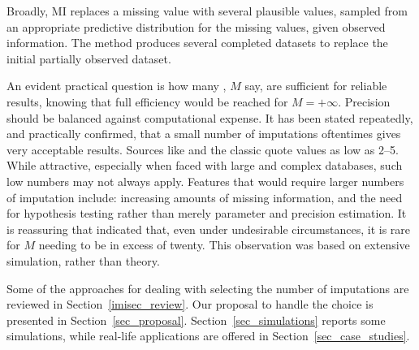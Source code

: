 \documentclass[11pt,a5paper,twoside]{book}
\begin{document}
Broadly, MI replaces a missing value with several plausible values, sampled from an appropriate predictive distribution for the missing values, given observed information. The method produces several completed datasets to replace the initial partially observed dataset.

An evident practical question is how many {\color{black}{imputed datasets}}, $M$ say, are sufficient for reliable results, knowing that full efficiency would be reached for $M=+\infty$. Precision should be balanced against computational expense. It has been stated repeatedly, and practically confirmed, that a small number of imputations oftentimes gives very acceptable results. Sources like \cite{rubin1987} and the classic \cite{littlerubin2002} quote values as low as 2--5. While attractive, especially when faced with large and complex databases, such low numbers may not always apply. Features that would require larger numbers of imputation include: increasing amounts of missing information, and the need for hypothesis testing rather than merely parameter and precision estimation. It is reassuring that \cite{schafer1997} indicated that, even under undesirable circumstances, it is rare for $M$ needing to be in excess of twenty. This observation was based on extensive simulation, rather than theory. 

Some of the approaches for dealing with selecting the number of imputations are reviewed in Section~\ref{imisec_review}. Our proposal to handle the choice is presented in 
Section~\ref{sec_proposal}. Section~\ref{sec_simulations} reports some simulations, while real-life applications are offered in Section~\ref{sec_case_studies}. 
\end{document}
